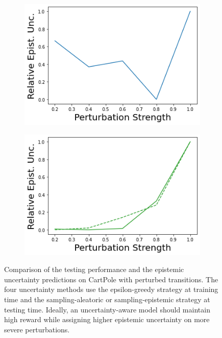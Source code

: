 \begin{figure}
\begin{subfigure}{.245\textwidth}
        \includegraphics[width=\textwidth]{sections/011_icml2022/resources/transition_shift-DKL-CartPoleShift-v0-mean_epistemic_uncertainty_.png}
    \end{subfigure}
    \begin{subfigure}{.245\textwidth}
        \includegraphics[width=\textwidth]{sections/011_icml2022/resources/transition_shift-PostNet-CartPoleShift-v0-mean_epistemic_uncertainty_.png}
    \end{subfigure}
        \vspace{-2mm}
    \caption{Comparison of the testing performance and the epistemic uncertainty predictions on CartPole with perturbed transitions. The four uncertainty methods use the epsilon-greedy strategy at training time and the sampling-aleatoric or sampling-epistemic strategy at testing time. Ideally, an uncertainty-aware model should maintain high reward while assigning higher epistemic uncertainty on more severe perturbations.}
    \label{fig:strategy-transition-shift-testing-performance-cartpole}
        \vspace{-3mm}
\end{figure}